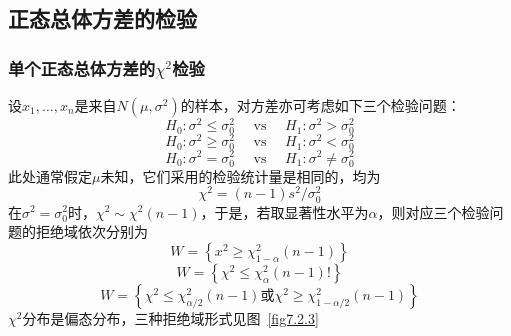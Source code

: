 \subsection{正态总体方差的检验\label{7.2.3}}

\subsubsection{单个正态总体方差的$\chi^{2}$检验}

设$x_{1},\dotsc,x_{n}$是来自$N(\mu ,\sigma^{2})$的样本，对方差亦可考虑如下三个检验问题：
\begin{equation}\label{eq7.2.22}
H _ { 0 } : \sigma ^ { 2 } \leq \sigma _ { 0 } ^ { 2 } \quad \text { vs } \quad H _ { 1 } : \sigma ^ { 2 } > \sigma _ { 0 } ^ { 2 }
\end{equation}
\begin{equation}\label{eq7.2.23}
H _ { 0 } : \sigma ^ { 2 } \geq \sigma _ { 0 } ^ { 2 } \quad \text { vs } \quad H _ { 1 } : \sigma ^ { 2 } < \sigma _ { 0 } ^ { 2 }
\end{equation}
\begin{equation}\label{eq7.2.24}
H _ { 0 } : \sigma ^ { 2 } = \sigma _ { 0 } ^ { 2 } \quad \text { vs } \quad H _ { 1 } : \sigma ^ { 2 } \ne  \sigma _ { 0 } ^ { 2 }
\end{equation}
此处通常假定$\mu$未知，它们采用的检验统计量是相同的，均为
\begin{equation}\label{eq7.2.25}
\chi ^ { 2 } = ( n - 1 ) s ^ { 2 } / \sigma _ { 0 } ^ { 2 }
\end{equation}
在$\sigma ^ { 2 } = \sigma _ { 0 } ^ { 2 }$时，$\chi ^ { 2 } \sim \chi ^ { 2 } ( n - 1 )$，于是，若取显著性水平为$\alpha$，则对应三个检验问题的拒绝域依次分别为
\[W = \left\{ x ^ { 2 } \geq \chi _ { 1 -\alpha } ^ { 2 } ( n - 1 ) \right\}\]
\[
W=\left\{\chi^2\le\chi_{\alpha}^{2}\left(n-1\right)!\right\}
\]
\[
W=\left\{\chi^2\le\chi_{\alpha/2}^{2}\left(n-1\right)\textrm{或}\chi^2\geq\chi_{1-\alpha/2}^{2}\left(n-1\right)\right\}
\]
$\chi^{2}$分布是偏态分布，三种拒绝域形式见图~\ref{fig7.2.3}
